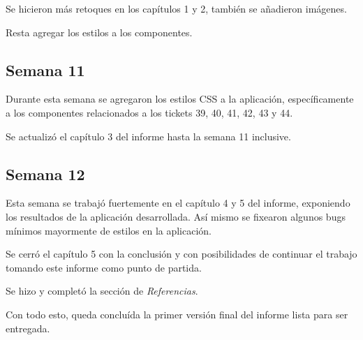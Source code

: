 Se hicieron más retoques en los capítulos 1 y 2, también se añadieron imágenes.

Resta agregar los estilos a los componentes.

\subsection{Semana 11}
Durante esta semana se agregaron los estilos CSS a la aplicación, específicamente a los componentes
relacionados a los tickets 39, 40, 41, 42, 43 y 44. 

Se actualizó el capítulo 3 del informe hasta la semana 11 inclusive.


\subsection{Semana 12}
Esta semana se trabajó fuertemente en el capítulo 4 y 5 del informe, exponiendo los resultados de la aplicación desarrollada. Así mismo se fixearon algunos bugs mínimos mayormente de estilos en la 
aplicación.

Se cerró el capítulo 5 con la conclusión y con posibilidades de continuar el trabajo tomando este
informe como punto de partida.

Se hizo y completó la sección de \textit{Referencias}.

Con todo esto, queda concluída la primer versión final del informe lista para ser entregada.
